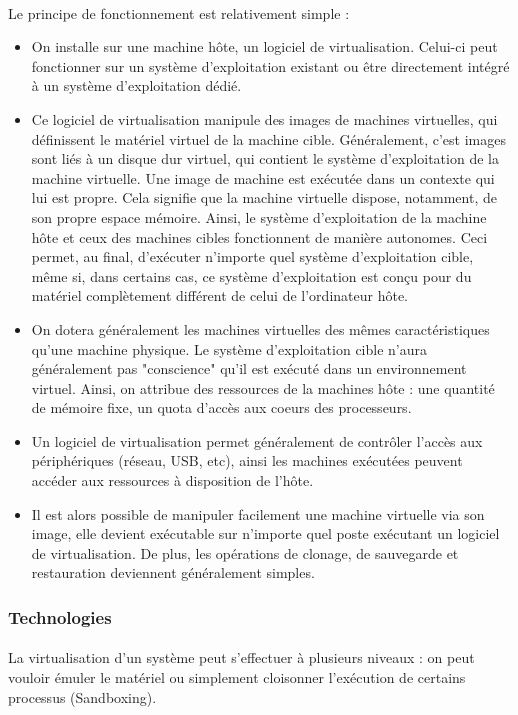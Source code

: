 \paragraph{} Le principe de fonctionnement est relativement simple :
\begin{itemize}
\item  On installe sur une machine hôte, un logiciel de virtualisation. Celui-ci
peut fonctionner sur un système d'exploitation existant ou être directement
intégré à un système d'exploitation dédié.
\item Ce logiciel de virtualisation manipule des images de machines virtuelles,
qui définissent le matériel virtuel de la machine cible. Généralement, c'est
images sont liés à un disque dur virtuel, qui contient le système d'exploitation
de la machine virtuelle. Une image de machine est exécutée dans un contexte qui
lui est propre. Cela signifie que la machine virtuelle dispose, notamment, de
son propre espace mémoire. Ainsi, le système d'exploitation de la machine hôte
et ceux des machines cibles fonctionnent de manière autonomes. Ceci permet, au
final, d'exécuter n'importe quel système d'exploitation cible, même si, dans
certains cas, ce système d'exploitation est conçu pour du matériel complètement
différent de celui de l'ordinateur hôte.
\item On dotera généralement les machines virtuelles des mêmes caractéristiques
qu'une machine physique. Le système d'exploitation cible n'aura généralement pas
"conscience" qu'il est exécuté dans un environnement virtuel. Ainsi, on attribue
des ressources de la machines hôte : une quantité de mémoire fixe, un quota
d'accès aux coeurs des processeurs.
\item Un logiciel de virtualisation permet généralement de contrôler l'accès aux
périphériques (réseau, USB, etc), ainsi les machines exécutées peuvent accéder
aux ressources à disposition de l'hôte.
\item Il est alors possible de manipuler facilement une machine virtuelle via
son image, elle devient exécutable sur n'importe quel poste exécutant un
logiciel de virtualisation. De plus, les opérations de clonage, de sauvegarde et
restauration deviennent généralement simples.
\end{itemize}

\subsubsection{Technologies}

\paragraph{} La virtualisation d'un système peut s'effectuer à plusieurs niveaux
: on peut vouloir émuler le matériel ou simplement cloisonner l'exécution de
certains processus (Sandboxing).


